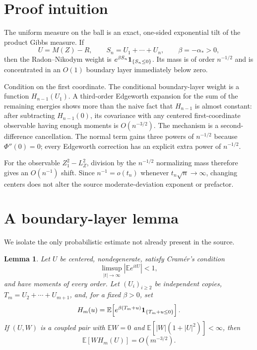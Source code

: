 \documentclass[11pt]{article}
\newtheorem{lemma}[theorem]{Lemma}
\newcommand{\E}{\mathbb E}
\begin{document}
\section{Proof intuition}

The uniform measure on the ball is an exact, one-sided exponential tilt of
the product Gibbs measure.  If
\[
 U=M(Z)-R,\qquad S_n=U_1+\cdots+U_n,\qquad \beta=-\alpha_*>0,
\]
then the Radon--Nikodym weight is $e^{\beta S_n}{\bf1}_{\{S_n\le0\}}$.
Its mass is of order $n^{-1/2}$ and is concentrated in an $O(1)$ boundary
layer immediately below zero.

Condition on the first coordinate.  The conditional boundary-layer weight
is a function $H_{n-1}(U_1)$.  A third-order Edgeworth expansion for the sum
of the remaining energies shows more than the naive fact that $H_{n-1}$ is
almost constant: after subtracting $H_{n-1}(0)$, its covariance with any
centered first-coordinate observable having enough moments is
$O(n^{-3/2})$.  The mechanism is a second-difference cancellation.  The
normal term gains three powers of $n^{-1/2}$ because $\Phi''(0)=0$; every
Edgeworth correction has an explicit extra power of $n^{-1/2}$.

For the observable $Z_1^2-L_Z^2$, division by the $n^{-1/2}$ normalizing
mass therefore gives an $O(n^{-1})$ shift.  Since $n^{-1}=o(t_n)$ whenever
$t_n\sqrt n\to\infty$, changing centers does not alter the source
moderate-deviation exponent or prefactor.

\section{A boundary-layer lemma}

We isolate the only probabilistic estimate not already present in the source.

\begin{lemma}\label{lem:boundary}
Let $U$ be centered, nondegenerate, satisfy Cram\'er's condition
\[
 \limsup_{|t|\to\infty}|\E e^{itU}|<1,
\]
and have moments of every order.  Let $(U_i)_{i\ge2}$ be independent copies,
$T_m=U_2+\cdots+U_{m+1}$, and, for a fixed $\beta>0$, set
\[
 H_m(u)=\E\!\left[e^{\beta(T_m+u)}
                 {\bf1}_{\{T_m+u\le0\}}\right].
\]
If $(U,W)$ is a coupled pair with $\E W=0$ and
$\E[|W|(1+|U|^2)]<\infty$, then
\[
 \E[W H_m(U)]=O(m^{-3/2}).
\]
\end{lemma}
\end{document}
